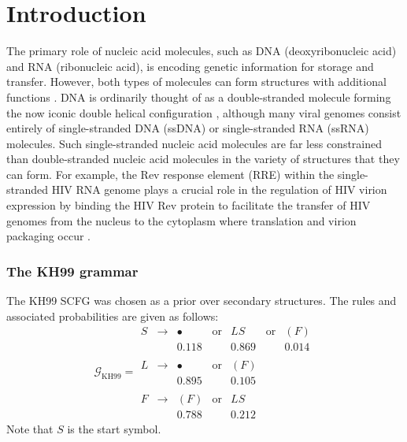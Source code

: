 \documentclass[nogrid]{MBE}%
\begin{document}
\section{Introduction}
The primary role of nucleic acid molecules, such as DNA (deoxyribonucleic acid) and RNA (ribonucleic acid), is encoding genetic information for storage and transfer. However, both types of molecules can form structures with additional functions \citep{mattick2003challenging}. DNA is ordinarily thought of as a double-stranded molecule forming the now iconic double helical configuration \citep{watson1953molecular}, although many viral genomes consist entirely of single-stranded DNA (ssDNA) or single-stranded RNA (ssRNA) molecules. Such single-stranded nucleic acid molecules are far less constrained than double-stranded nucleic acid molecules in the variety of structures that they can form. For example, the Rev response element (RRE) within the single-stranded HIV RNA genome plays a crucial role in the regulation of HIV virion expression by binding the HIV Rev protein to facilitate the transfer of HIV genomes from the nucleus to the cytoplasm where translation and virion packaging occur \citep{heaphy1990hiv,daugherty2010structural}.

\subsubsection{The KH99 grammar}
The KH99 SCFG \citep{knudsen1999rna} was chosen as a prior over secondary structures. The rules and associated probabilities are given as follows:
\begin{equation}
\mathcal{G}_{\text{KH99}} = \begin{array}{ccccccc}
S & \rightarrow & \bullet & \text{or} & LS & \text{or} & (F)\\
&  & 0.118 &  & 0.869 & & 0.014\\
& & & & & \\
L & \rightarrow & \bullet & \text{or} & (F) & & \\
&  & 0.895 &  & 0.105 & & \\
& & & & & \\
F & \rightarrow & (F) & \text{or} & LS & & \\
&  & 0.788 &  & 0.212  & &
\end{array}
\label{eq:kh99}
\end{equation}
Note that $S$ is the start symbol. 
\end{document}
